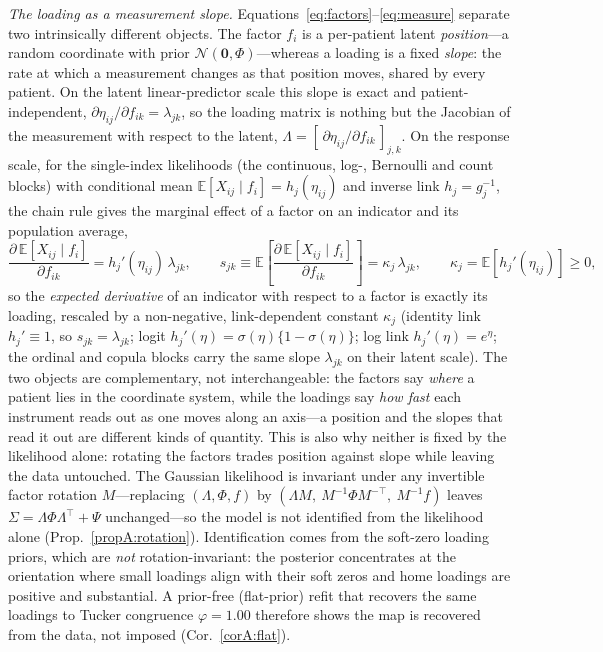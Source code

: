 \emph{The loading as a measurement slope.} Equations~\eqref{eq:factors}--\eqref{eq:measure}
separate two intrinsically different objects. The factor $f_i$ is a per-patient latent
\emph{position}---a random coordinate with prior $\mathcal N(\mathbf 0,\Phi)$---whereas a
loading is a fixed \emph{slope}: the rate at which a measurement changes as that position
moves, shared by every patient. On the latent linear-predictor scale this slope is exact and
patient-independent, $\partial\eta_{ij}/\partial f_{ik}=\lambda_{jk}$, so the loading matrix is
nothing but the Jacobian of the measurement with respect to the latent,
$\Lambda=[\,\partial\eta_{ij}/\partial f_{ik}\,]_{j,k}$. On the response scale, for the
single-index likelihoods (the continuous, log-, Bernoulli and count blocks) with conditional
mean $\mathbb E[X_{ij}\mid f_i]=h_j(\eta_{ij})$ and inverse link $h_j=g_j^{-1}$, the chain rule
gives the marginal effect of a factor on an indicator and its population average,
\begin{equation}
  \frac{\partial\,\mathbb E[X_{ij}\mid f_i]}{\partial f_{ik}}=h_j'(\eta_{ij})\,\lambda_{jk},
  \qquad
  s_{jk}\equiv\mathbb E\!\left[\frac{\partial\,\mathbb E[X_{ij}\mid f_i]}{\partial f_{ik}}\right]
  =\kappa_j\,\lambda_{jk},\qquad
  \kappa_j=\mathbb E\!\left[h_j'(\eta_{ij})\right]\ge 0 ,
  \label{eq:m-slope}
\end{equation}
so the \emph{expected derivative} of an indicator with respect to a factor is exactly its
loading, rescaled by a non-negative, link-dependent constant $\kappa_j$ (identity link
$h_j'\equiv1$, so $s_{jk}=\lambda_{jk}$; logit $h_j'(\eta)=\sigma(\eta)\{1-\sigma(\eta)\}$; log
link $h_j'(\eta)=e^{\eta}$; the ordinal and copula blocks carry the same slope $\lambda_{jk}$
on their latent scale). The two objects are complementary, not interchangeable: the factors say
\emph{where} a patient lies in the coordinate system, while the loadings say \emph{how fast}
each instrument reads out as one moves along an axis---a position and the slopes that read it
out are different kinds of quantity. This is also why neither is fixed by the likelihood alone:
rotating the factors trades position against slope while leaving the data untouched. The
Gaussian likelihood is invariant under any invertible factor rotation
$M$---replacing $(\Lambda,\Phi,f)$ by $(\Lambda M,\ M^{-1}\Phi M^{-\top},\ M^{-1}f)$ leaves
$\Sigma=\Lambda\Phi\Lambda^{\top}+\Psi$ unchanged---so the model is not identified from the
likelihood alone (Prop.~\ref{propA:rotation}). Identification comes from the soft-zero
loading priors, which are \emph{not} rotation-invariant: the posterior concentrates at the
orientation where small loadings align with their soft zeros and home loadings are positive
and substantial. A prior-free (flat-prior) refit that recovers the same loadings to Tucker
congruence $\varphi=1.00$ therefore shows the map is recovered from the data, not imposed
(Cor.~\ref{corA:flat}).

